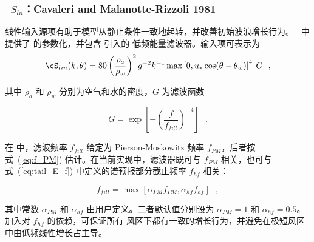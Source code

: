 \vsssub
\subsubsection{~$S_{ln}$：Cavaleri and Malanotte-Rizzoli 1981} \label{sec:LN1}
\vsssub


\noindent
线性输入源项有助于模型从静止条件一致地起转，并改善初始波浪增长行为。
\ws\ 中提供了 \cite{art:CMR81} 的参数化，并包含 \cite{tol:JPO92} 引入的
低频能量滤波器。输入项可表示为
\begin{equation}
\cS_{lin}(k,\theta) = 80 \left( \frac{\rho_a}{\rho_w} \right ) ^2
  g^{-2}  k^{-1} \max \left [ 0 , u_* \cos (\theta - \theta_w) \right ]^4 \: G
   \:\:\: , \label{eq:CMR81}
\end{equation}

\noindent
其中 $\rho_a$ 和 $\rho_w$ 分别为空气和水的密度，$G$ 为滤波函数

\begin{equation}
G = \exp \left [ - \left ( \frac{f}{f_{filt}} \right ) ^{-4} \right ]
\:\:\: . \label{eq:GSln}
\end{equation}

\noindent
在 \cite {tol:JPO92} 中，滤波频率 $f_{filt}$ 给定为 Pierson-Moskowitz
频率 $f_{PM}$，后者按式~(\ref{eq:f_PM}) 估计。在当前实现中，滤波器既可与
$f_{PM}$ 相关，也可与式~(\ref{eq:tail_E_f}) 中定义的谱预报部分截止频率
$f_{hf}$ 相关：

\begin{equation}
f_{filt} = \max \left [ \alpha_{PM} f_{PM} , \alpha_{hf} f_{hf} \right ]
\:\:\: ,
\end{equation}

\noindent
其中常数 $\alpha_{PM}$ 和 $\alpha_{hf}$ 由用户定义。二者默认值分别设为
$\alpha_{PM} = 1$ 和 $\alpha_{hf} = 0.5$。加入对 $f_{hf}$ 的依赖，可保证所有
风区下都有一致的增长行为，并避免在极短风区中由低频线性增长占主导。
